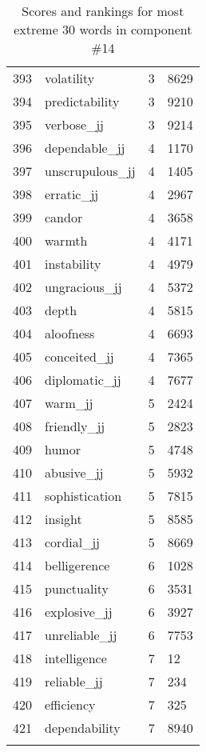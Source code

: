 \begin{longtable}[!htbp]{| rlr@{.}l |}
    393 & volatility & 3 & 8629 \\
    394 & predictability & 3 & 9210 \\
    395 & verbose\_jj & 3 & 9214 \\
    396 & dependable\_jj & 4 & 1170 \\
    397 & unscrupulous\_jj & 4 & 1405 \\
    398 & erratic\_jj & 4 & 2967 \\
    399 & candor & 4 & 3658 \\
    400 & warmth & 4 & 4171 \\
    401 & instability & 4 & 4979 \\
    402 & ungracious\_jj & 4 & 5372 \\
    403 & depth & 4 & 5815 \\
    404 & aloofness & 4 & 6693 \\
    405 & conceited\_jj & 4 & 7365 \\
    406 & diplomatic\_jj & 4 & 7677 \\
    407 & warm\_jj & 5 & 2424 \\
    408 & friendly\_jj & 5 & 2823 \\
    409 & humor & 5 & 4748 \\
    410 & abusive\_jj & 5 & 5932 \\
    411 & sophistication & 5 & 7815 \\
    412 & insight & 5 & 8585 \\
    413 & cordial\_jj & 5 & 8669 \\
    414 & belligerence & 6 & 1028 \\
    415 & punctuality & 6 & 3531 \\
    416 & explosive\_jj & 6 & 3927 \\
    417 & unreliable\_jj & 6 & 7753 \\
    418 & intelligence & 7 & 12 \\
    419 & reliable\_jj & 7 & 234 \\
    420 & efficiency & 7 & 325 \\
    421 & dependability & 7 & 8940 \\
    \hline
    \caption{Scores and rankings for most extreme 30 words in component \#14} \\
\end{longtable}
